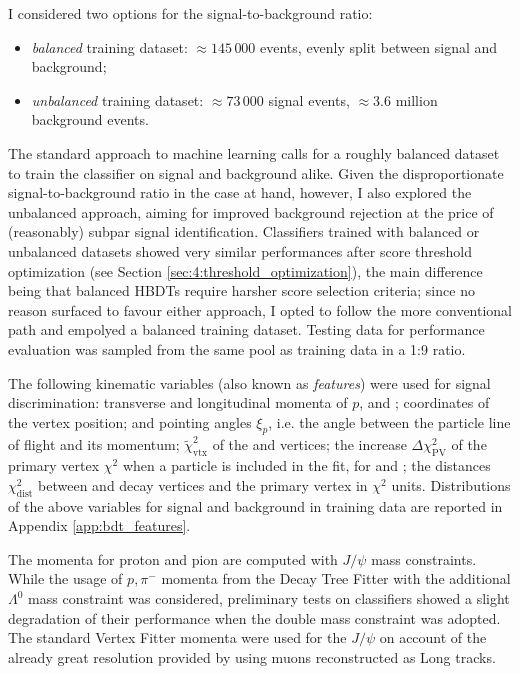 I considered two options for the signal-to-background ratio:
\begin{itemize}
	\item \textit{balanced} training dataset: $\approx 145\,000$ events, evenly split between signal and background;
	\item \textit{unbalanced} training dataset: $\approx 73\,000$ signal events, $\approx 3.6$ million background events.
\end{itemize}
The standard approach to machine learning calls for a roughly balanced dataset to train the classifier on signal and background alike.
Given the disproportionate signal-to-background ratio in the case at hand, however, I also explored the unbalanced approach, aiming for improved background rejection at the price of (reasonably) subpar signal identification.
Classifiers trained with balanced or unbalanced datasets showed very similar performances after score threshold optimization (see Section \ref{sec:4:threshold_optimization}), the main difference being that balanced HBDTs require harsher score selection criteria;
since no reason surfaced to favour either approach, I opted to follow the more conventional path and empolyed a balanced training dataset.
Testing data for performance evaluation was sampled from the same pool as training data in a 1:9 ratio.

The following kinematic variables (also known as \textit{features}) were used for signal discrimination:
transverse and longitudinal momenta of $p$, \pim and \jpsi;
coordinates of the \lambdadecay vertex position;
\lbz and \lz pointing angles $\xi_p$, i.e. the angle between the particle line of flight and its momentum;
$\tilde{\chi}^2_\text{vtx}$ of the \demonstratorshort and \lambdadecay vertices;
the increase $\Delta \chi^2_\text{PV}$ of the primary vertex $\chi^2$ when a particle is included in the fit, for \lbz and \lz;
the distances $\chi^2_\text{dist}$ between \lbz and \lz decay vertices and the primary vertex in $\chi^2$ units.
Distributions of the above variables for signal and background in training data are reported in Appendix \ref{app:bdt_features}.

The momenta for proton and pion are computed with $J/\psi$ mass constraints.
While the usage of $p,\pi^-$ momenta from the Decay Tree Fitter with the additional $\Lambda^0$ mass constraint was considered, preliminary tests on classifiers showed a slight degradation of their performance when the double mass constraint was adopted.
The standard Vertex Fitter momenta were used for the $J/\psi$ on account of the already great resolution provided by using muons reconstructed as Long tracks.

